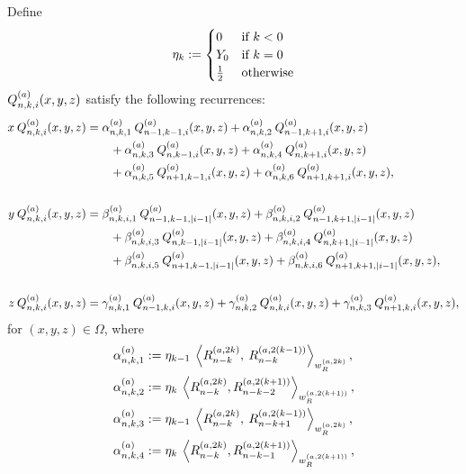 \documentclass[11pt, oneside]{article}   	%
\begin{document}
\begin{lemma}\label{lemma:Qrecurrence} 
Define
\begin{align}
	\eta_{k} :=
		\begin{cases}
			0 &\text{if } k < 0 \\
			Y_0 &\text{if } k = 0 \\
			\frac{1}{2} &\text{otherwise}
		\end{cases}
\end{align}
$Q_{n,k,i}^{(a)}(x,y,z)$ satisfy the following recurrences:
\begin{align*}
	x \: Q_{n,k,i}^{(a)}(x,y,z) &= \alpha^{(a)}_{n,k,1} \:  Q^{(a)}_{n-1, k-1, i}(x, y, z) + \alpha^{(a)}_{n,k,2} \:  Q^{(a)}_{n-1, k+1, i}(x, y, z) \nonumber \\
		& \quad \quad + \alpha^{(a)}_{n,k,3} \:  Q^{(a)}_{n, k-1, i}(x, y, z) + \alpha^{(a)}_{n,k,4} \:  Q^{(a)}_{n, k+1, i}(x, y, z) \nonumber \\
		& \quad \quad + \alpha^{(a)}_{n,k,5} \:  Q^{(a)}_{n+1, k-1, i}(x, y, z) + \alpha^{(a)}_{n,k,6} \:  Q^{(a)}_{n+1, k+1, i}(x, y, z), \\ \\
	y \: Q_{n,k,i}^{(a)}(x,y,z) &= \beta^{(a)}_{n,k,i,1} \:  Q^{(a)}_{n-1, k-1, |i-1|}(x, y, z) + \beta^{(a)}_{n,k,i,2} \:  Q^{(a)}_{n-1, k+1, |i-1|}(x, y, z) \nonumber \\
		& \quad \quad + \beta^{(a)}_{n,k,i,3} \:  Q^{(a)}_{n, k-1, |i-1|}(x, y, z) + \beta^{(a)}_{n,k,i,4} \:  Q^{(a)}_{n, k+1, |i-1|}(x, y, z) \nonumber \\
		& \quad \quad + \beta^{(a)}_{n,k,i,5} \:  Q^{(a)}_{n+1, k-1, |i-1|}(x, y, z) + \beta^{(a)}_{n,k,i,6} \:  Q^{(a)}_{n+1, k+1, |i-1|}(x, y, z), \\ \\
	z \: Q_{n,k,i}^{(a)}(x,y,z) &= \gamma^{(a)}_{n,k,1} \: Q^{(a)}_{n-1, k, i}(x, y, z) + \gamma^{(a)}_{n,k,2} \: Q^{(a)}_{n, k, i}(x, y, z) + \gamma^{(a)}_{n,k,3} \: Q^{(a)}_{n+1, k, i}(x, y, z),
\end{align*}
for $(x,y,z) \in \Omega$, where
\begin{align*}
	\alphaa_{n,k,1} &:= \eta_{k-1} \: \ip<\genjacnmk^{(a, 2k)}, \: \genjacnmk^{(a, 2(k-1))}>_{\genjacw^{(a, 2k)}}, \\
	\alphaa_{n,k,2} &:= \eta_{k} \: \ip<\genjacnmk^{(a, 2k)}, \genjac_{n-k-2}^{(a, 2(k+1))}>_{\genjacw^{(a, 2(k+1))}}, \\
	\alphaa_{n,k,3} &:=\eta_{k-1} \: \ip<\genjacnmk^{(a, 2k)}, \: \genjac_{n-k+1}^{(a, 2(k-1))}>_{\genjacw^{(a, 2k)}}, \\
	\alphaa_{n,k,4} &:= \eta_{k} \: \ip<\genjacnmk^{(a, 2k)}, \genjac_{n-k-1}^{(a, 2(k+1))}>_{\genjacw^{(a, 2(k+1))}}, \\

\end{align*}
\end{lemma}
\end{document}
